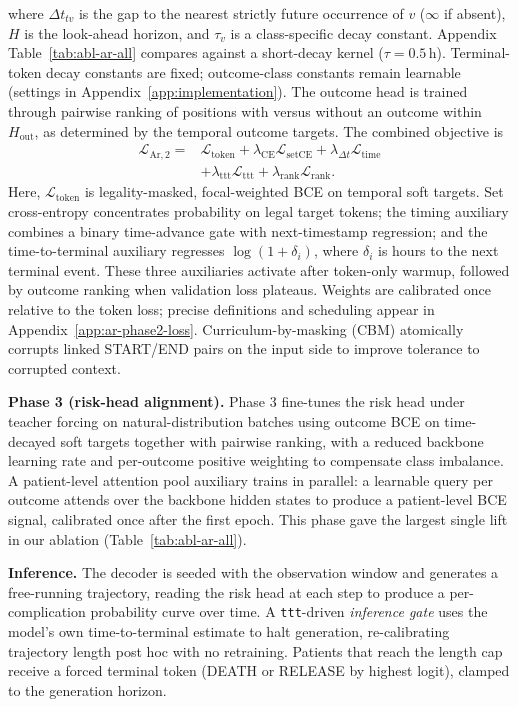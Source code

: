\documentclass[letterpaper]{article} %
\begin{document}
where $\Delta t_{tv}$ is the gap to the nearest strictly future occurrence of $v$ ($\infty$ if absent), $H$ is the look-ahead horizon, and $\tau_v$ is a class-specific decay constant. Appendix Table~\ref{tab:abl-ar-all} compares against a short-decay kernel ($\tau=0.5$\,h). Terminal-token decay constants are fixed; outcome-class constants remain learnable (settings in Appendix~\ref{app:implementation}). The outcome head is trained through pairwise ranking of positions with versus without an outcome within $H_{\text{out}}$, as determined by the temporal outcome targets. The combined objective is
\begin{equation}
\begin{aligned}
\mathcal{L}_{\mathrm{Ar},2} ={}& \mathcal{L}_{\mathrm{token}}
+ \lambda_{\mathrm{CE}}\mathcal{L}_{\mathrm{setCE}}
+ \lambda_{\Delta t}\mathcal{L}_{\mathrm{time}}\\
&+ \lambda_{\mathrm{ttt}}\mathcal{L}_{\mathrm{ttt}}
+ \lambda_{\mathrm{rank}}\mathcal{L}_{\mathrm{rank}}.
\end{aligned}
\end{equation}
Here, $\mathcal{L}_{\mathrm{token}}$ is legality-masked, focal-weighted BCE on temporal soft targets. Set cross-entropy concentrates probability on legal target tokens; the timing auxiliary combines a binary time-advance gate with next-timestamp regression; and the time-to-terminal auxiliary regresses $\log(1+\delta_i)$, where $\delta_i$ is hours to the next terminal event. These three auxiliaries activate after token-only warmup, followed by outcome ranking when validation loss plateaus. Weights are calibrated once relative to the token loss; precise definitions and scheduling appear in Appendix~\ref{app:ar-phase2-loss}. Curriculum-by-masking (CBM) atomically corrupts linked START/END pairs on the input side to improve tolerance to corrupted context.

\textbf{Phase 3 (risk-head alignment).} Phase 3 fine-tunes the risk head under teacher forcing on natural-distribution batches using outcome BCE on time-decayed soft targets together with pairwise ranking, with a reduced backbone learning rate and per-outcome positive weighting to compensate class imbalance. A patient-level attention pool auxiliary trains in parallel: a learnable query per outcome attends over the backbone hidden states to produce a patient-level BCE signal, calibrated once after the first epoch. This phase gave the largest single lift in our ablation (Table~\ref{tab:abl-ar-all}).

\textbf{Inference.} The decoder is seeded with the observation window and generates a free-running trajectory, reading the risk head at each step to produce a per-complication probability curve over time. A \texttt{ttt}-driven \emph{inference gate} uses the model's own time-to-terminal estimate to halt generation, re-calibrating trajectory length post hoc with no retraining. Patients that reach the length cap receive a forced terminal token (DEATH or RELEASE by highest logit), clamped to the generation horizon.
\end{document}
